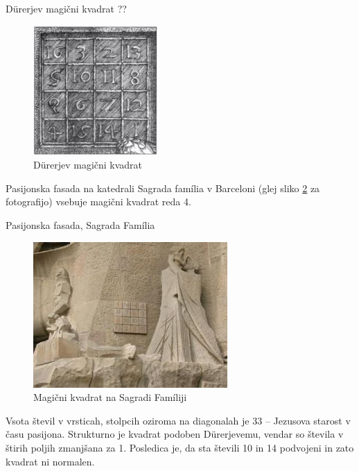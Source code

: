\documentclass[a4paper,12pt]{article}
\theoremstyle{definition}
\theoremstyle{plain}
\theoremstyle{plain}
\begin{document}
Dürerjev magični kvadrat ??

\begin{figure}[!ht]
   \centering
   \caption{Dürerjev magični kvadrat}
   \label{Durerjev kvadrat}
   \includegraphics[scale=1.3]{durer.png} 
\end{figure}

Pasijonska fasada na katedrali Sagrada família v Barceloni
(glej sliko \ref{Sagradi kvadrat} za fotografijo) vsebuje magični kvadrat reda 4.

Pasijonska fasada, Sagrada Família

\begin{figure}[!ht]
   \centering
   \caption{Magični kvadrat na Sagradi Famíliji}
   \label{Sagradi kvadrat}
   \includegraphics[scale=.45]{sagrada.png}
\end{figure}

Vsota števil v vrsticah, stolpcih oziroma na diagonalah je 33 -- Jezusova starost
v času pasijona. Strukturno je kvadrat podoben Dürerjevemu, vendar so števila
v štirih poljih zmanjšana za 1. Posledica je, da sta števili 10 in 14 podvojeni
in zato kvadrat ni normalen.
\end{document}
